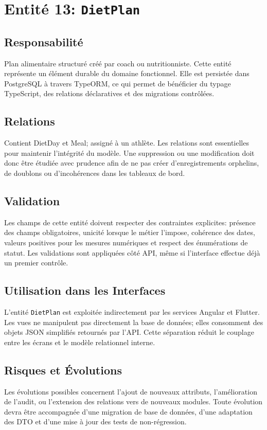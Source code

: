 \section{Entité 13: \texttt{DietPlan}}
\subsection{Responsabilité}
Plan alimentaire structuré créé par coach ou nutritionniste. Cette entité représente un élément durable du domaine fonctionnel. Elle est persistée dans PostgreSQL à travers TypeORM, ce qui permet de bénéficier du typage TypeScript, des relations déclaratives et des migrations contrôlées.

\subsection{Relations}
Contient DietDay et Meal; assigné à un athlète. Les relations sont essentielles pour maintenir l'intégrité du modèle. Une suppression ou une modification doit donc être étudiée avec prudence afin de ne pas créer d'enregistrements orphelins, de doublons ou d'incohérences dans les tableaux de bord.

\subsection{Validation}
Les champs de cette entité doivent respecter des contraintes explicites: présence des champs obligatoires, unicité lorsque le métier l'impose, cohérence des dates, valeurs positives pour les mesures numériques et respect des énumérations de statut. Les validations sont appliquées côté API, même si l'interface effectue déjà un premier contrôle.

\subsection{Utilisation dans les Interfaces}
L'entité \texttt{DietPlan} est exploitée indirectement par les services Angular et Flutter. Les vues ne manipulent pas directement la base de données; elles consomment des objets JSON simplifiés retournés par l'API. Cette séparation réduit le couplage entre les écrans et le modèle relationnel interne.

\subsection{Risques et Évolutions}
Les évolutions possibles concernent l'ajout de nouveaux attributs, l'amélioration de l'audit, ou l'extension des relations vers de nouveaux modules. Toute évolution devra être accompagnée d'une migration de base de données, d'une adaptation des DTO et d'une mise à jour des tests de non-régression.

